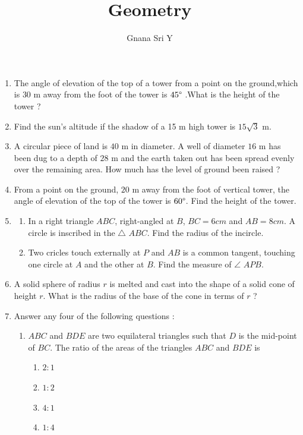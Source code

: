 \documentclass[11pt]{article}
\begin{document}
\title{Geometry}
\author{Gnana Sri  Y}
\maketitle

\begin{enumerate}
	\item The angle of elevation of the top of a tower from a point on the ground,which is $30$ m away from the foot of the tower is $45\degree$ .What is the height of the tower ?
	\item Find the sun's altitude if the shadow of a 15 m high tower is ${15}\sqrt{3}$ m.
	\item A circular piece of land is $40$ m in diameter. A well of diameter $16$ m has been dug to a depth of $28$ m and the earth taken out has been spread evenly over the remaining area. How much has the level of ground been raised ?
	\item From a point on the ground, $20$ m away from the foot of vertical tower, the angle of elevation of the top of the tower is $60\degree$. Find the height of the tower.
	\item
	\begin{enumerate}
		\item In a right triangle $ABC$, right-angled at $B$, $BC= 6 cm$ and $AB = 8 cm$. A circle is inscribed in the {$\triangle$} $ABC$. Find the radius of the incircle.
		\item Two cricles touch externally at $P$ and $AB$ is a common tangent, touching one circle at $A$ and the other at $B$. Find the measure of $\angle$ $APB$.
	\end{enumerate}
	\item A solid sphere of radius $r$ is melted and cast into the shape of a solid cone of height $r$. What is the radius of the base of the cone in terms of $r$ ?
	\item Answer any four of the following questions :
		\begin{enumerate}[label=(\roman*)]
			\item $ABC$ and $BDE$ are two equilateral triangles such that $D$ is the mid-point of $BC$. The ratio of the areas of the triangles $ABC$ and $BDE$ is
				\begin{enumerate}[label=(\Alph*)]
					\item $2 : 1$
					\item $1 : 2$
					\item $4 : 1$
					\item $1 : 4$
				\end{enumerate}

\end{enumerate}
\end{enumerate}
\end{document}
